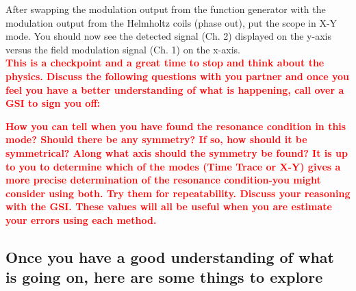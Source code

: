 \documentclass{../lab}
\begin{document}
After swapping the modulation output from the function generator with the modulation output from the Helmholtz coils (phase out), put the scope in X-Y mode. You should now see the detected signal (Ch. 2) displayed on the y-axis versus the field modulation signal (Ch. 1) on the x-axis. \\

\noindent\textbf{\textcolor{red}{This is a checkpoint and a great time to stop and think about the physics. Discuss the following questions with you partner and once you feel you have a better understanding of what is happening, call over a GSI to sign you off:}}

\textbf{\textcolor{red}{How you can tell when you have found the resonance condition in this mode? Should there be any symmetry? If so, how should it be symmetrical? Along what axis should the symmetry be found? It is up to you to determine which of the modes (Time Trace or X-Y) gives a more precise determination of the resonance condition-you might consider using both. Try them for repeatability. Discuss your reasoning with the GSI. These values will all be useful when you are estimate your errors using each method.}}

\newpage

\subsection{Once you have a good understanding of what is going on, here are some things to explore}
\end{document}

